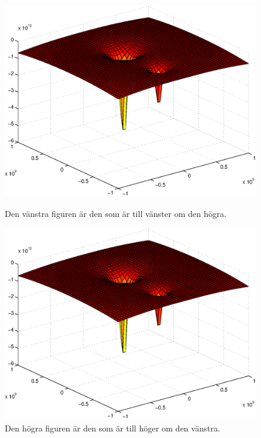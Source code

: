 \begin{figure}[!htb]
  \begin{minipage}[htb]{0.48\linewidth}
    \begin{center}
      \includegraphics[scale=.35]{images/surf.eps}
    \end{center}
    \caption[Den vänstra figuren.]{Den vänstra figuren är den som är
      till vänster om den högra.}
\label{fig:leftfig2}
  \end{minipage}\hfill
  \begin{minipage}[htb]{0.48\linewidth}
    \begin{center}
      \includegraphics[scale=.35]{images/surf.eps}
    \end{center}
    \caption[Den högra figuren.]{Den högra figuren är den som är
      till höger om den vänstra.}
\label{fig:rightfig2}
  \end{minipage}
\end{figure}

